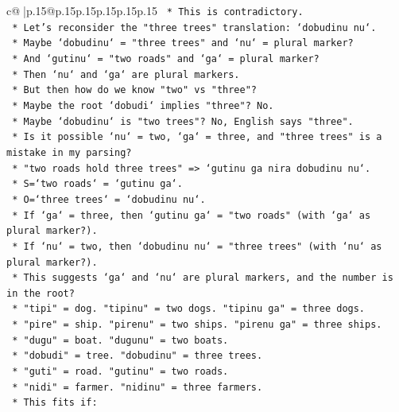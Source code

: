 \documentclass{article}
\begin{document}
{\begin{supertabular}{c@{$\;$}|p{.15\linewidth}@{}p{.15\linewidth}p{.15\linewidth}p{.15\linewidth}p{.15\linewidth}p{.15\linewidth}}
{{{\texttt{                *   This is contradictory.} \\
\texttt{            *   Let's reconsider the "three trees" translation: `dobudinu nu`.} \\
\texttt{            *   Maybe `dobudinu` = "three trees" and `nu` = plural marker?} \\
\texttt{            *   And `gutinu` = "two roads" and `ga` = plural marker?} \\
\texttt{            *   Then `nu` and `ga` are plural markers.} \\
\texttt{            *   But then how do we know "two" vs "three"?} \\
\texttt{            *   Maybe the root `dobudi` implies "three"? No.} \\
\texttt{            *   Maybe `dobudinu` is "two trees"? No, English says "three".} \\
\texttt{            *   Is it possible `nu` = two, `ga` = three, and "three trees" is a mistake in my parsing?} \\
\texttt{            *   "two roads hold three trees" => `gutinu ga nira dobudinu nu`.} \\
\texttt{            *   S=`two roads` = `gutinu ga`.} \\
\texttt{            *   O=`three trees` = `dobudinu nu`.} \\
\texttt{            *   If `ga` = three, then `gutinu ga` = "two roads" (with `ga` as plural marker?).} \\
\texttt{            *   If `nu` = two, then `dobudinu nu` = "three trees" (with `nu` as plural marker?).} \\
\texttt{            *   This suggests `ga` and `nu` are plural markers, and the number is in the root?} \\
\texttt{            *   "tipi" = dog. "tipinu" = two dogs. "tipinu ga" = three dogs.} \\
\texttt{            *   "pire" = ship. "pirenu" = two ships. "pirenu ga" = three ships.} \\
\texttt{            *   "dugu" = boat. "dugunu" = two boats.} \\
\texttt{            *   "dobudi" = tree. "dobudinu" = three trees.} \\
\texttt{            *   "guti" = road. "gutinu" = two roads.} \\
\texttt{            *   "nidi" = farmer. "nidinu" = three farmers.} \\
\texttt{            *   This fits if:} \\
}}}
\end{supertabular}}
\end{document}
